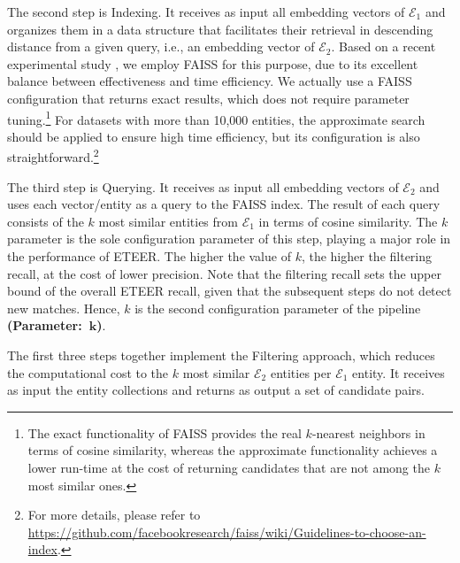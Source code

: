 The second step is Indexing. It receives as input all embedding vectors of $\mathcal{E}_1$ and organizes them in a data structure that facilitates their retrieval in descending distance from a given query, i.e., an embedding vector of $\mathcal{E}_2$. 
Based on a recent experimental study \cite{DBLP:journals/is/AumullerBF20}, we employ 
FAISS \cite{DBLP:journals/corr/abs-2401-08281} for this purpose, due to its excellent balance between effectiveness and time efficiency.
We actually use a FAISS configuration that returns exact results, which does not require parameter tuning.\footnote{{The exact functionality of FAISS provides the real $k$-nearest neighbors in terms of cosine similarity, whereas the approximate functionality achieves a lower run-time at the cost of returning candidates that are not among the $k$ most similar ones.}}
For datasets with more than 10,000 entities, the approximate search should be applied to ensure high time efficiency, but its configuration is also straightforward.\footnote{For more details, please refer to \underline{https://github.com/facebookresearch/faiss/wiki/Guidelines-to-choose-an-index}.}

The third step is Querying. It receives as input all embedding vectors of $\mathcal{E}_2$ and uses each vector/entity as a query to the FAISS index. The result of each query consists of the $k$ most similar entities from $\mathcal{E}_1$ in terms of cosine similarity. The $k$ parameter is the sole configuration parameter of this step, playing a major role in the performance of ETEER. The higher the value of $k$, the higher the filtering recall, at the cost of lower precision. Note that the filtering recall sets the upper bound of the overall ETEER recall, given that the subsequent steps do not detect new matches. Hence, $k$ is the second configuration parameter of the pipeline \textbf{(Parameter:~$\mathbf{k}$)}.

The first three steps together implement the Filtering approach, which reduces the computational cost to the $k$ most similar $\mathcal{E}_2$ entities per $\mathcal{E}_1$ entity. %
It receives as input the entity collections and returns as output a set of candidate pairs.%

